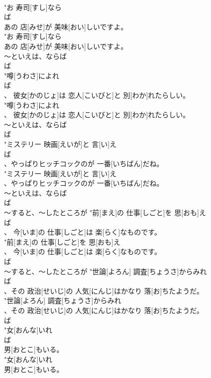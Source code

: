 \documentclass[8pt]{extreport}
\begin{document}
\begin{CJK}{UTF8}{min}
\\	"お 寿司[すし]なら
\\	ば
\\	あの 店[みせ]が 美味[おい]しいですよ。
\\	"お 寿司[すし]なら
\\	あの 店[みせ]が 美味[おい]しいですよ。
\\	～といえは、ならば	
\\	ば
\\	"噂[うわさ]によれ
\\	ば
\\	、 彼女[かのじょ]は 恋人[こいびと]と 別[わか]れたらしい。
\\	"噂[うわさ]によれ
\\	、 彼女[かのじょ]は 恋人[こいびと]と 別[わか]れたらしい。
\\	～といえは、ならば	
\\	ば
\\	"ミステリー 映画[えいが]と 言[い]え
\\	ば
\\	、やっぱりヒッチコックのが 一番[いちばん]だね。
\\	"ミステリー 映画[えいが]と 言[い]え
\\	、やっぱりヒッチコックのが 一番[いちばん]だね。
\\	～といえは、ならば	
\\	ば
\\	～すると、～したところが	"前[まえ]の 仕事[しごと]を 思[おも]え
\\	ば
\\	、 今[いま]の 仕事[しごと]は 楽[らく]なものです。
\\	"前[まえ]の 仕事[しごと]を 思[おも]え
\\	、 今[いま]の 仕事[しごと]は 楽[らく]なものです。
\\	ば
\\	～すると、～したところが	"世論[よろん] 調査[ちょうさ]からみれ
\\	ば
\\	、その 政治[せいじ]の 人気[にんじ]はかなり 落[お]ちたようだ。
\\	"世論[よろん] 調査[ちょうさ]からみれ
\\	、その 政治[せいじ]の 人気[にんじ]はかなり 落[お]ちたようだ。
\\	ば
\\	"女[おんな]いれ
\\	ば
\\	男[おとこ]もいる。
\\	"女[おんな]いれ
\\	男[おとこ]もいる。

\end{CJK}
\end{document}
